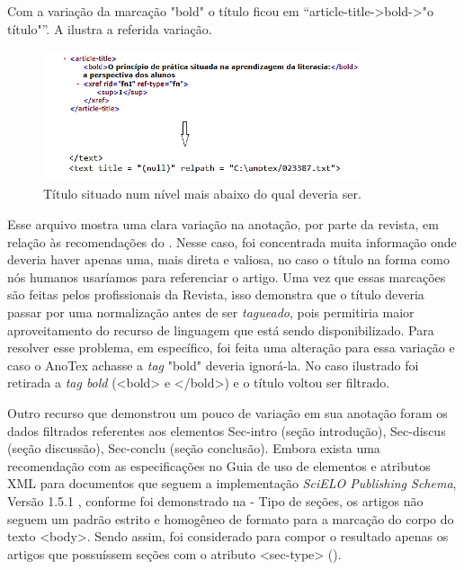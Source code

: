 \documentclass[portuguese]{textolivre}
\begin{document}
Com a variação da marcação "bold" o título ficou em “article-title->bold->"o título"”. A  ilustra a referida variação.

\begin{figure}[htbp]
 \centering
 \includegraphics[width=0.85\textwidth]{Fig11.png}
 \caption{Título situado num nível mais abaixo do qual deveria ser.}
 \label{fig-11}
\end{figure}

Esse arquivo mostra uma clara variação na anotação, por parte da revista, em relação às recomendações do \textcite{Scielo}. Nesse caso, foi concentrada muita informação onde deveria haver apenas uma, mais direta e valiosa, no caso o título na forma como nós humanos usaríamos para referenciar o artigo. Uma vez que essas marcações são feitas pelos profissionais da Revista, isso demonstra que o título deveria passar por uma normalização antes de ser \textit{tagueado}, pois permitiria maior aproveitamento do recurso de linguagem que está sendo disponibilizado. Para resolver esse problema, em específico, foi feita uma alteração para essa variação e caso o AnoTex achasse a \textit{tag} "bold" deveria ignorá-la. No caso ilustrado foi retirada a \textit{tag bold} (<bold> e </bold>) e o título voltou ser filtrado.

Outro recurso que demonstrou um pouco de variação em sua anotação foram os dados filtrados referentes aos elementos Sec-intro (seção introdução), Sec-discus (seção discussão), Sec-conclu (seção conclusão). Embora exista uma recomendação com as especificações no Guia de uso de elementos e atributos XML para documentos que seguem a implementação \textit{SciELO Publishing Schema}, Versão 1.5.1 \cite{Scielo}, conforme foi demonstrado na  - Tipo de seções, os artigos não seguem um padrão estrito e homogêneo de formato para a marcação do corpo do texto <body>. Sendo assim, foi considerado para compor o resultado apenas os artigos que possuíssem seções com o atributo <sec-type> ().
\end{document}
